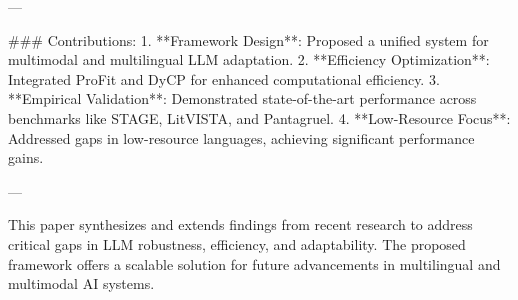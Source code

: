 ---

### Contributions:
1. **Framework Design**: Proposed a unified system for multimodal and multilingual LLM adaptation.
2. **Efficiency Optimization**: Integrated ProFit and DyCP for enhanced computational efficiency.
3. **Empirical Validation**: Demonstrated state-of-the-art performance across benchmarks like STAGE, LitVISTA, and Pantagruel.
4. **Low-Resource Focus**: Addressed gaps in low-resource languages, achieving significant performance gains.

--- 

This paper synthesizes and extends findings from recent research to address critical gaps in LLM robustness, efficiency, and adaptability. The proposed framework offers a scalable solution for future advancements in multilingual and multimodal AI systems.